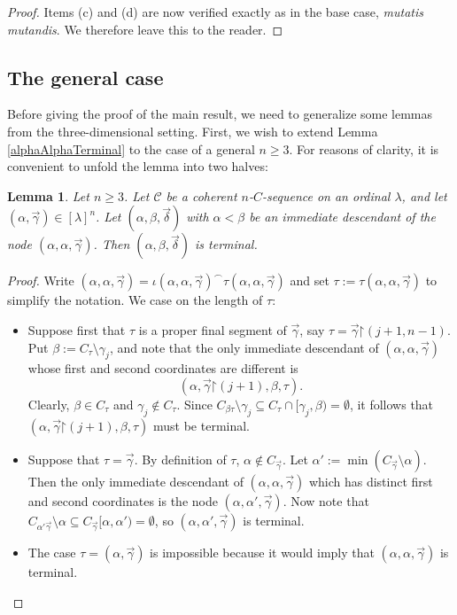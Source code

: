 \documentclass{amsart}
\numberwithin{theorem}{section}
\newtheorem{lemma}[theorem]{Lemma}
\theoremstyle{definition}
\newcommand{\restr}{\mathord{\upharpoonright}}
\renewcommand{\subset}{\subseteq}
\newcommand{\C}{\mathcal{C}}
\begin{document}
\begin{proof}
  Items (c) and (d) are now verified exactly as in the base case, \emph{mutatis 
  mutandis}. We therefore leave this to the reader.
\end{proof}

\subsection{The general case}

Before giving the proof of the main result, we need to generalize some lemmas from the three-dimensional setting. First, we wish to extend Lemma \ref{alphaAlphaTerminal} to the case of a general $n\ge 3$. For reasons of clarity, it is convenient to unfold the lemma into two halves:

\begin{lemma}\label{alphaAlphaimmediate}
Let $n\ge 3$. Let $\C$ be a coherent $n$-$C$-sequence on an ordinal $\lambda$, and let 
$(\alpha,\vec{\gamma}) \in [\lambda]^n$. Let $(\alpha,\beta,\vec\delta)$ with $\alpha<\beta$ be an immediate descendant of the node $(\alpha,\alpha,\vec\gamma)$. Then $(\alpha,\beta,\vec\delta)$ is terminal.
\end{lemma}

\begin{proof} Write $(\alpha,\alpha,\vec\gamma)=\iota(\alpha,\alpha,\vec\gamma)^\smallfrown\tau(\alpha,\alpha,\vec\gamma)$ and set $\tau:=\tau(\alpha,\alpha,\vec\gamma)$ to simplify the notation. We case on the length of $\tau$:
\begin{itemize}
\item Suppose first that $\tau$ is a proper final segment of $\vec\gamma$, say $\tau=\vec\gamma\restr (j+1,n-1)$. Put $\beta:=C_\tau\setminus\gamma_j$, and note that the only immediate descendant of $(\alpha,\alpha,\vec\gamma)$ whose first and second coordinates are different is
\[
(\alpha,\vec\gamma\restr(j+1),\beta,\tau).
\]
Clearly, $\beta\in C_\tau$ and $\gamma_j\not\in C_{\tau}$. Since $C_{\beta\tau}\setminus \gamma_j \subset C_\tau \cap [\gamma_j,\beta)=\emptyset$, it follows that $(\alpha,\vec\gamma\restr(j+1),\beta,\tau)$ must be terminal.

\item Suppose that $\tau=\vec\gamma$. By definition of $\tau$, $\alpha\not\in C_{\vec\gamma}$. Let $\alpha':=\min(C_{\vec\gamma}\setminus \alpha)$. Then the only immediate descendant of $(\alpha,\alpha,\vec\gamma)$ which has distinct first and second coordinates is the node $(\alpha,\alpha',\vec\gamma)$. Now note that $C_{\alpha'\vec\gamma}\setminus\alpha\subset C_{\vec{\gamma}}[\alpha,\alpha')=\emptyset$, so $(\alpha,\alpha',\vec\gamma)$ is terminal.

\item The case $\tau=(\alpha,\vec\gamma)$ is impossible because it would imply that $(\alpha,\alpha,\vec\gamma)$ is terminal.\qedhere
\end{itemize}
\end{proof}
\end{document}
